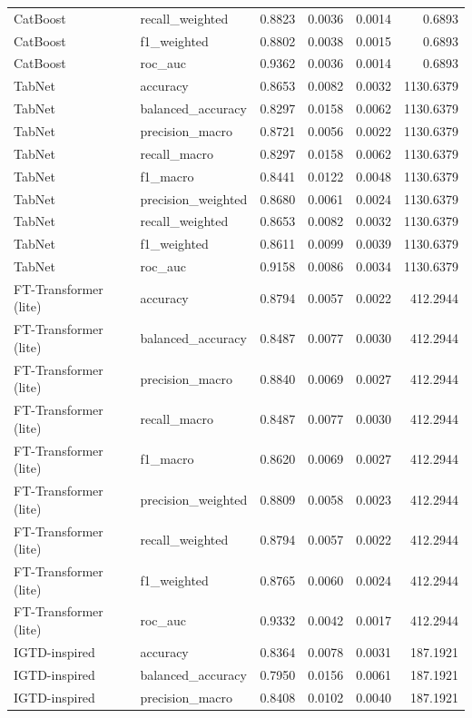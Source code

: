 \begin{tabular}{llrrrr}
CatBoost & recall_weighted & 0.8823 & 0.0036 & 0.0014 & 0.6893 \\
CatBoost & f1_weighted & 0.8802 & 0.0038 & 0.0015 & 0.6893 \\
CatBoost & roc_auc & 0.9362 & 0.0036 & 0.0014 & 0.6893 \\
TabNet & accuracy & 0.8653 & 0.0082 & 0.0032 & 1130.6379 \\
TabNet & balanced_accuracy & 0.8297 & 0.0158 & 0.0062 & 1130.6379 \\
TabNet & precision_macro & 0.8721 & 0.0056 & 0.0022 & 1130.6379 \\
TabNet & recall_macro & 0.8297 & 0.0158 & 0.0062 & 1130.6379 \\
TabNet & f1_macro & 0.8441 & 0.0122 & 0.0048 & 1130.6379 \\
TabNet & precision_weighted & 0.8680 & 0.0061 & 0.0024 & 1130.6379 \\
TabNet & recall_weighted & 0.8653 & 0.0082 & 0.0032 & 1130.6379 \\
TabNet & f1_weighted & 0.8611 & 0.0099 & 0.0039 & 1130.6379 \\
TabNet & roc_auc & 0.9158 & 0.0086 & 0.0034 & 1130.6379 \\
FT-Transformer (lite) & accuracy & 0.8794 & 0.0057 & 0.0022 & 412.2944 \\
FT-Transformer (lite) & balanced_accuracy & 0.8487 & 0.0077 & 0.0030 & 412.2944 \\
FT-Transformer (lite) & precision_macro & 0.8840 & 0.0069 & 0.0027 & 412.2944 \\
FT-Transformer (lite) & recall_macro & 0.8487 & 0.0077 & 0.0030 & 412.2944 \\
FT-Transformer (lite) & f1_macro & 0.8620 & 0.0069 & 0.0027 & 412.2944 \\
FT-Transformer (lite) & precision_weighted & 0.8809 & 0.0058 & 0.0023 & 412.2944 \\
FT-Transformer (lite) & recall_weighted & 0.8794 & 0.0057 & 0.0022 & 412.2944 \\
FT-Transformer (lite) & f1_weighted & 0.8765 & 0.0060 & 0.0024 & 412.2944 \\
FT-Transformer (lite) & roc_auc & 0.9332 & 0.0042 & 0.0017 & 412.2944 \\
IGTD-inspired & accuracy & 0.8364 & 0.0078 & 0.0031 & 187.1921 \\
IGTD-inspired & balanced_accuracy & 0.7950 & 0.0156 & 0.0061 & 187.1921 \\
IGTD-inspired & precision_macro & 0.8408 & 0.0102 & 0.0040 & 187.1921 \\

\end{tabular}
